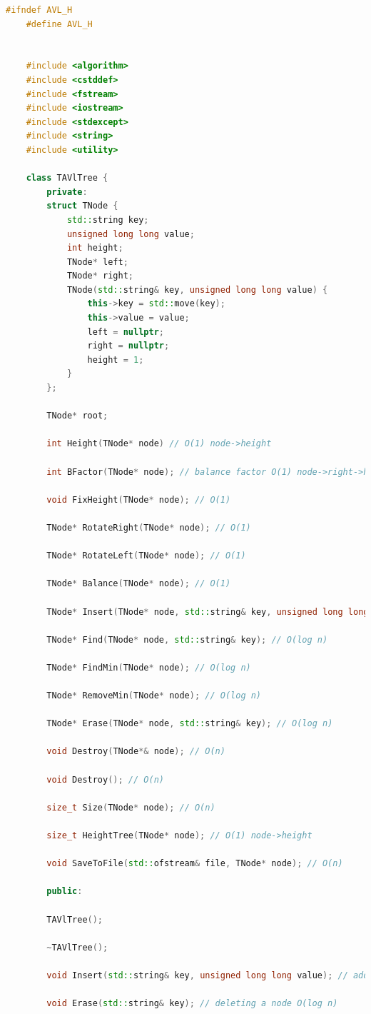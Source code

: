 \begin{lstlisting}[language=C++]
	#ifndef AVL_H
	#define AVL_H
	
	
	#include <algorithm>
	#include <cstddef>
	#include <fstream>
	#include <iostream>
	#include <stdexcept>
	#include <string>
	#include <utility>
	
	class TAVlTree {
		private:
		struct TNode {
			std::string key;
			unsigned long long value;
			int height;
			TNode* left;
			TNode* right;
			TNode(std::string& key, unsigned long long value) {
				this->key = std::move(key);
				this->value = value;
				left = nullptr;
				right = nullptr;
				height = 1;
			}
		};
	
		TNode* root;
	
		int Height(TNode* node) // O(1) node->height
	
		int BFactor(TNode* node); // balance factor O(1) node->right->height - node->left->height
	
		void FixHeight(TNode* node); // O(1)
	
		TNode* RotateRight(TNode* node); // O(1)
	
		TNode* RotateLeft(TNode* node); // O(1)
	
		TNode* Balance(TNode* node); // O(1)
	
		TNode* Insert(TNode* node, std::string& key, unsigned long long value); O(log n)
	
		TNode* Find(TNode* node, std::string& key); // O(log n)
	
		TNode* FindMin(TNode* node); // O(log n)
	
		TNode* RemoveMin(TNode* node); // O(log n)
	
		TNode* Erase(TNode* node, std::string& key); // O(log n)
	
		void Destroy(TNode*& node); // O(n)
	
		void Destroy(); // O(n)
	
		size_t Size(TNode* node); // O(n)
	
		size_t HeightTree(TNode* node); // O(1) node->height
	
		void SaveToFile(std::ofstream& file, TNode* node); // O(n)
	
		public:
	
		TAVlTree();
	
		~TAVlTree();
	
		void Insert(std::string& key, unsigned long long value); // adding a node O(log n)

		void Erase(std::string& key); // deleting a node O(log n)
	

\end{lstlisting}
